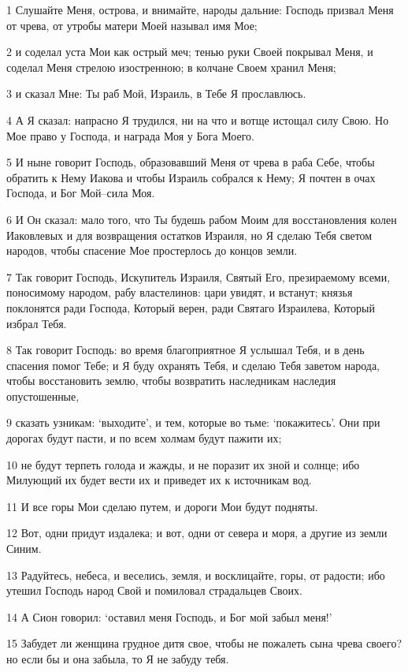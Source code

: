\par 1 Слушайте Меня, острова, и внимайте, народы дальние: Господь призвал Меня от чрева, от утробы матери Моей называл имя Мое;
\par 2 и соделал уста Мои как острый меч; тенью руки Своей покрывал Меня, и соделал Меня стрелою изостренною; в колчане Своем хранил Меня;
\par 3 и сказал Мне: Ты раб Мой, Израиль, в Тебе Я прославлюсь.
\par 4 А Я сказал: напрасно Я трудился, ни на что и вотще истощал силу Свою. Но Мое право у Господа, и награда Моя у Бога Моего.
\par 5 И ныне говорит Господь, образовавший Меня от чрева в раба Себе, чтобы обратить к Нему Иакова и чтобы Израиль собрался к Нему; Я почтен в очах Господа, и Бог Мой--сила Моя.
\par 6 И Он сказал: мало того, что Ты будешь рабом Моим для восстановления колен Иаковлевых и для возвращения остатков Израиля, но Я сделаю Тебя светом народов, чтобы спасение Мое простерлось до концов земли.
\par 7 Так говорит Господь, Искупитель Израиля, Святый Его, презираемому всеми, поносимому народом, рабу властелинов: цари увидят, и встанут; князья поклонятся ради Господа, Который верен, ради Святаго Израилева, Который избрал Тебя.
\par 8 Так говорит Господь: во время благоприятное Я услышал Тебя, и в день спасения помог Тебе; и Я буду охранять Тебя, и сделаю Тебя заветом народа, чтобы восстановить землю, чтобы возвратить наследникам наследия опустошенные,
\par 9 сказать узникам: `выходите', и тем, которые во тьме: `покажитесь'. Они при дорогах будут пасти, и по всем холмам будут пажити их;
\par 10 не будут терпеть голода и жажды, и не поразит их зной и солнце; ибо Милующий их будет вести их и приведет их к источникам вод.
\par 11 И все горы Мои сделаю путем, и дороги Мои будут подняты.
\par 12 Вот, одни придут издалека; и вот, одни от севера и моря, а другие из земли Синим.
\par 13 Радуйтесь, небеса, и веселись, земля, и восклицайте, горы, от радости; ибо утешил Господь народ Свой и помиловал страдальцев Своих.
\par 14 А Сион говорил: `оставил меня Господь, и Бог мой забыл меня!'
\par 15 Забудет ли женщина грудное дитя свое, чтобы не пожалеть сына чрева своего? но если бы и она забыла, то Я не забуду тебя.
